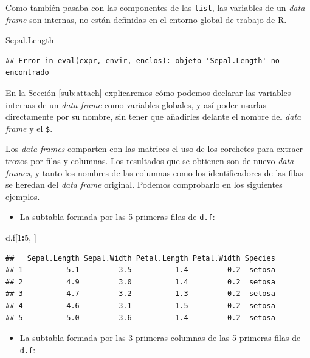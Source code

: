 \documentclass[]{book}
\newenvironment{Shaded}{\begin{snugshade}}{\end{snugshade}}
\newcommand{\DecValTok}[1]{\textcolor[rgb]{0.00,0.00,0.81}{#1}}
\newcommand{\NormalTok}[1]{#1}
\newcommand{\OperatorTok}[1]{\textcolor[rgb]{0.81,0.36,0.00}{\textbf{#1}}}
\providecommand{\tightlist}{%
  \setlength{\itemsep}{0pt}\setlength{\parskip}{0pt}}
\theoremstyle{definition}
\theoremstyle{definition}
\theoremstyle{definition}
\theoremstyle{remark}
\begin{document}
Como también pasaba con las componentes de las \texttt{list}, las variables de un \emph{data frame} son internas, no están definidas en el entorno global de trabajo de R.

\begin{Shaded}
\begin{Highlighting}[]
\NormalTok{Sepal.Length }
\end{Highlighting}
\end{Shaded}

\begin{verbatim}
## Error in eval(expr, envir, enclos): objeto 'Sepal.Length' no encontrado
\end{verbatim}

En la Sección \ref{sub:attach} explicaremos cómo podemos declarar las variables internas de un \emph{data frame} como variables globales, y así poder usarlas directamente por su nombre, sin tener que añadirles delante el nombre del \emph{data frame} y el \texttt{\$}.

Los \emph{data frames} comparten con las matrices el uso de los corchetes para extraer trozos por filas y columnas. Los resultados que se obtienen son de nuevo \emph{data frames}, y tanto los nombres de las columnas como los identificadores de las filas se heredan del \emph{data frame} original. Podemos comprobarlo en los siguientes ejemplos.

\begin{itemize}
\tightlist
\item
  La subtabla formada por las 5 primeras filas de \texttt{d.f}:
\end{itemize}

\begin{Shaded}
\begin{Highlighting}[]
\NormalTok{d.f[}\DecValTok{1}\OperatorTok{:}\DecValTok{5}\NormalTok{, ]}
\end{Highlighting}
\end{Shaded}

\begin{verbatim}
##   Sepal.Length Sepal.Width Petal.Length Petal.Width Species
## 1          5.1         3.5          1.4         0.2  setosa
## 2          4.9         3.0          1.4         0.2  setosa
## 3          4.7         3.2          1.3         0.2  setosa
## 4          4.6         3.1          1.5         0.2  setosa
## 5          5.0         3.6          1.4         0.2  setosa
\end{verbatim}

\begin{itemize}
\tightlist
\item
  La subtabla formada por las 3 primeras columnas de las 5 primeras filas de \texttt{d.f}:
\end{itemize}
\end{document}
